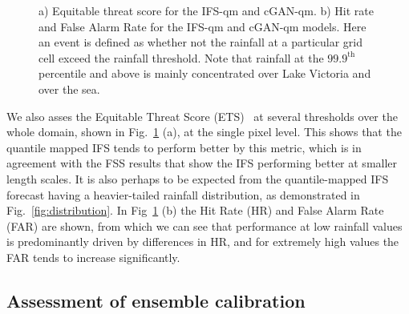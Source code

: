 \documentclass{article}
\begin{document}
\begin{figure}[ht]
\begin{subfigure}[t]{0.49\textwidth}
     \caption{}
     \end{subfigure}
     \caption{ a) Equitable threat score for the IFS-qm and cGAN-qm. b) Hit rate and False Alarm Rate for the IFS-qm and cGAN-qm models. Here an event is defined as whether not the rainfall at a particular grid cell exceed the rainfall threshold. Note that rainfall at the $99.9^{\text{th}}$ percentile and above is mainly concentrated over Lake Victoria and over the sea.}
     \label{fig:ets}
\end{figure}

We also asses the Equitable Threat Score (ETS)~\citep{schaefer_critical_1990, wilks_forecast_2019} at several thresholds over the whole domain, shown in Fig.~\ref{fig:ets} (a), at the single pixel level. This shows that the quantile mapped IFS tends to perform better by this metric, which is in agreement with the FSS results that show the IFS performing better at smaller length scales. It is also perhaps to be expected from the quantile-mapped IFS forecast having a heavier-tailed rainfall distribution, as demonstrated in Fig.~\ref{fig:distribution}. In Fig~\ref{fig:ets} (b) the Hit Rate (HR) and False Alarm Rate (FAR) are shown, from which we can see that performance at low rainfall values is predominantly driven by differences in HR, and for extremely high values the FAR tends to increase significantly.


        
\subsection{Assessment of ensemble calibration}
\end{document}
